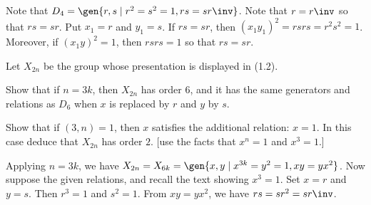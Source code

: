 \begin{problems}[resume]
    \begin{sol}
        Note that $D_4 = \gen{r, s \mid r^2 = s^2 = 1, rs = sr\inv}$. Note that $r = r\inv$ so that $rs = sr$. Put $x_1 = r$ and $y_1 = s$. If $rs = sr$, then $(x_1y_1)^2 = rsrs = r^2s^2 = 1$. Moreover, if $(x_1y)^2 = 1$, then $rsrs = 1$ so that $rs = sr$. 
    \end{sol}
    \item Let $X_{2n}$ be the group whose presentation is displayed in (1.2).
    \begin{problems}
        \item Show that if $n = 3k$, then $X_{2n}$ has order $6$, and it has the same generators and relations as $D_6$ when $x$ is replaced by $r$ and $y$ by $s$.
        \item Show that if $(3, n) = 1$, then $x$ satisfies the additional relation: $x = 1$. In this case deduce that $X_{2n}$ has order $2$. [use the facts that $x^n = 1$ and $x^3 = 1$.]
    \end{problems}
    \begin{solalph}
        \item Applying $n = 3k$, we have $X_{2n} = X_{6k} = \gen{x, y \mid x^{3k} = y^2 = 1, xy = yx^2}$. Now suppose the given relations, and recall the text showing $x^3 = 1$. Set $x = r$ and $y = s$. Then $r^3 = 1$ and $s^2 = 1$. From $xy = yx^2$, we have $rs = sr^2 = sr\inv$.
        

\end{solalph}
\end{problems}

